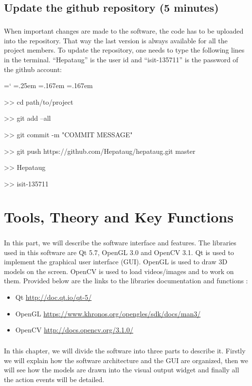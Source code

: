 \documentclass[12pt]{report}
\DeclareRobustCommand*{\ttfamily}{
  \origttfamily
  \hyphenchar\font=`\-\relax
  \fontdimen3\font=.25em\relax
  \fontdimen4\font=.167em\relax
  \fontdimen7\font=.167em\relax
}
\newenvironment{code}{\ttfamily}{}
\begin{document}
\section{Update the github repository (5 minutes)}
\paragraph{}
	When important changes are made to the software, the code has to be uploaded into the repository. That way the last version is always available for all the project members. To update the repository, one needs to type the following lines in the terminal. ``Hepataug'' is the user id and ``isit-135711'' is the password of the github account:

\begin{code}
>> cd path/to/project

>> git add --all

>> git commit -m "COMMIT MESSAGE"

>> git push https://github.com/Hepataug/hepataug.git master

>> Hepataug

>> isit-135711
\end{code}



\chapter{Tools, Theory and Key Functions} \label{sec:tools, theory and key functions}
\paragraph{}
	In this part, we will describe the software interface and features. The libraries used in this software are Qt 5.7, OpenGL 3.0 and OpenCV 3.1. Qt is used to implement the graphical user interface (GUI). OpenGL is used to draw 3D models on the screen. OpenCV is used to load videos/images and to work on them. Provided below are the links to the libraries documentation and functions :
	\begin{itemize}
	\item Qt \url{http://doc.qt.io/qt-5/}
	\item OpenGL \url{https://www.khronos.org/opengles/sdk/docs/man3/}
	\item OpenCV \url{http://docs.opencv.org/3.1.0/}
	\end{itemize}

\paragraph{}
In this chapter, we will divide the software into three parts to describe it. Firstly we will explain how the software architecture and the GUI are organized, then we will see how the models are drawn into the visual output widget and finally all the action events will be detailed.
\end{document}
